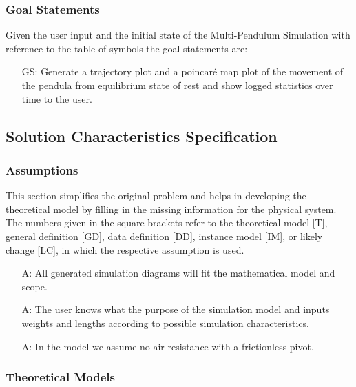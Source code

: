 \documentclass[12pt]{article}
\newcounter{assumpnum} %
\newcounter{goalnum} %
\newcommand{\progname}{Multi-Pendulum Simulation }
\begin{document}
\subsubsection{Goal Statements}

\noindent Given the user input and the initial state of the \progname with reference to the table of symbols the goal
statements are:

\begin{itemize}

\item[GS\refstepcounter{goalnum}\thegoalnum:] Generate a trajectory plot and a poincaré map plot of 
the movement of the pendula from equilibrium state of rest and show logged
statistics over time to the user.
\end{itemize}


\newpage

\subsection{Solution Characteristics Specification}

\subsubsection{Assumptions}

This section simplifies the original problem and helps in developing the
theoretical model by filling in the missing information for the physical
system. The numbers given in the square brackets refer to the theoretical model
[T], general definition [GD], data definition [DD], instance model [IM], or
likely change [LC], in which the respective assumption is used.

\begin{itemize}
\item[A\refstepcounter{assumpnum}\theassumpnum:]
  All generated simulation diagrams will fit the mathematical model and scope.
\item[A\refstepcounter{assumpnum}\theassumpnum:]
The user knows what the purpose of the simulation model and inputs weights and lengths
according to possible simulation characteristics.
\item[A\refstepcounter{assumpnum}\theassumpnum:]
In the model we assume no air resistance with a frictionless pivot.
\end{itemize}

\newpage

\subsubsection{Theoretical Models}\label{sec_theoretical}
\end{document}
